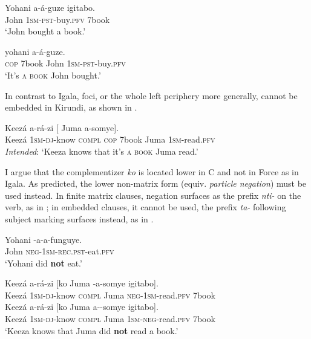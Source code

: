\documentclass[output=paper,colorlinks,citecolor=brown,
]{langscibook}
\begin{document}
\ea \label{kirfoc}
\begin{xlist}
    \ex %
    \gll Yohani a-\'{a}-guze igitabo.\\
    John 1\textsc{sm}-\textsc{pst}-buy.\textsc{pfv} 7book\\
    \glt `John bought a book.' 

    \ex\gll {} yohani a-\'{a}-guze.\\
    {\textsc{cop} 7book} John 1\textsc{sm}-\textsc{pst}-buy.\textsc{pfv}\\
    \glt `It’s \textsc{a book} John bought.'    
\end{xlist}    
\z

In contrast to Igala, foci, or the whole left periphery more generally, cannot be embedded in Kirundi, as shown in .

\ea \label{kirembfoc}
\gll {*} Keez\'{a} a-r\'{a}-zi [   Juma a-somye].\\
    {} Keez\'{a} 1\textsc{sm}-\textsc{dj}-know \textsc{compl} {\textsc{cop}\hspace{0.1em} 7book} Juma 1\textsc{sm}-read.{\textsc{pfv}} \\
    \glt \textit{Intended}: `Keeza knows that it's \textsc{a book} Juma read.’
\z

I argue that the complementizer \textit{ko} is located lower in C\xhead{} and not in Force\xhead{} as in Igala. As predicted, the lower non-matrix form (equiv. \textit{particle negation}) must be used instead. In finite matrix clauses, negation surfaces as the prefix \textit{nti-} on the verb, as in ; in embedded clauses, it cannot be used, the prefix \textit{ta-} following subject marking surfaces instead, as in .

\ea \label{kirmatneg}
\gll Yohani -a-a-funguye.\\
        John {\textsc{neg}}-1\textsc{sm}-\textsc{rec.pst}-eat.{\textsc{pfv}}\\
        \glt `Yohani did \textbf{not} eat.’
\z

\ea \label{kirembneg} %
\begin{xlist}
    \ex\gll {*} Keez\'{a} a-r\'{a}-zi [ko Juma -a-somye igitabo].\\
    {} Keez\'{a} 1\textsc{sm}-\textsc{dj}-know \textsc{compl} Juma {\textsc{neg}}-1\textsc{sm}-read.\textsc{pfv} 7book \\
    
    \ex\gll Keez\'{a} a-r\'{a}-zi [ko Juma a--somye igitabo].\\
    Keez\'{a} 1\textsc{sm}-\textsc{dj}-know \textsc{compl} Juma 1\textsc{sm}-{\textsc{neg}}-read.\textsc{pfv} 7book \\
    \glt `Keeza knows that Juma did \textbf{not} read a book.’ \hfill \citep{chaperon2022}
\end{xlist}
\z
\end{document}
